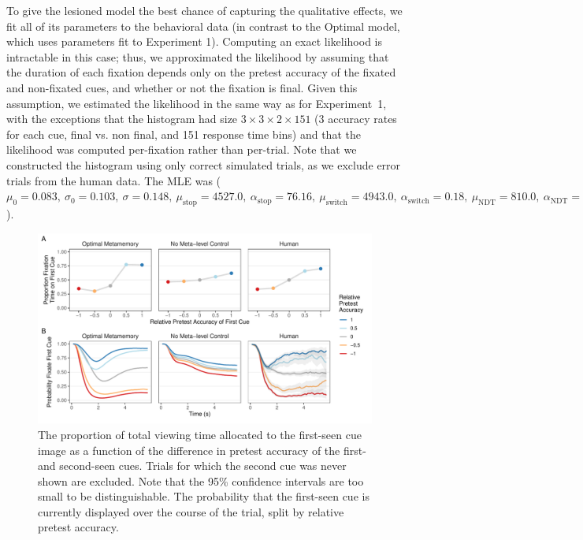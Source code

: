 To give the lesioned model the best chance of capturing the qualitative effects, we fit all of its parameters to the behavioral data (in contrast to the Optimal model, which uses parameters fit to Experiment 1). Computing an exact likelihood is intractable in this case; thus, we approximated the likelihood by assuming that the duration of each fixation depends only on the pretest accuracy of the fixated and non-fixated cues, and whether or not the fixation is final. Given this assumption, we estimated the likelihood in the same way as for Experiment~1, with the exceptions that the histogram had size $3 \times 3 \times 2 \times 151$ (3 accuracy rates for each cue, final vs. non final, and 151 response time bins) and that the likelihood was computed per-fixation rather than per-trial. Note that we constructed the histogram using only correct simulated trials, as we exclude error trials from the human data. The MLE was (\(
            \mu_0 = 0.083,\ 
            \sigma_0 = 0.103,\ 
            \sigma = 0.148,\ 
            \mu_\text{stop} = 4527.0,\ 
            \alpha_\text{stop} = 76.16,\ 
            \mu_\text{switch} = 4943.0,\ 
            \alpha_\text{switch} = 0.18,\ 
            \mu_\text{NDT} = 810.0,\ 
            \alpha_\text{NDT} = 3.59,\ 
        \)).

\begin{figure}[ht]
  \centering
  \includegraphics[scale=.65]{figs/memory/exp2/overall_timecourse.pdf}
  \caption{
    \subcap{A} The proportion of total viewing time allocated to the first-seen cue image as a function of the difference in pretest accuracy of the first- and second-seen cues. Trials for which the second cue was never shown are excluded. Note that the 95\% confidence intervals are too small to be distinguishable.
    \subcap{B} The probability that the first-seen cue is currently displayed over the course of the trial, split by relative pretest accuracy.
  \label{fig:timecourse}
  }
\end{figure}

